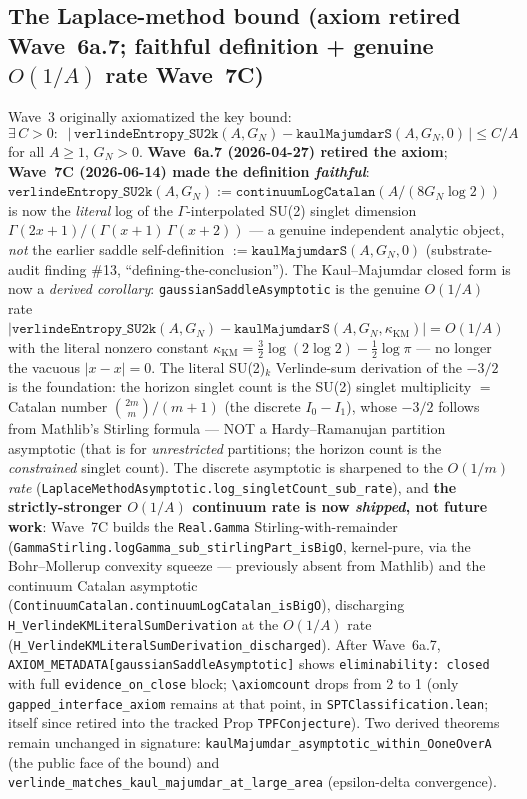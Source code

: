 \documentclass[aps,prd,twocolumn,showpacs,superscriptaddress,nofootinbib]{revtex4-2}
\begin{document}
\subsection{The Laplace-method bound (axiom retired Wave~6a.7; faithful definition + genuine $O(1/A)$ rate Wave~7C)}
\label{sec:saddle}

Wave~3 originally axiomatized the key bound:
\begin{equation}
\exists\,C > 0:\;\;
\bigl|\,\texttt{verlindeEntropy\_SU2k}(A, G_N) - \texttt{kaulMajumdarS}(A, G_N, 0)\,\bigr|
\leq C/A
\end{equation}
for all $A \geq 1$, $G_N > 0$.
\textbf{Wave~6a.7 (2026-04-27) retired the axiom}; \textbf{Wave~7C
(2026-06-14) made the definition \emph{faithful}}:
$\texttt{verlindeEntropy\_SU2k}(A, G_N) := \texttt{continuumLogCatalan}(A/(8 G_N \log 2))$
is now the \emph{literal} log of the $\Gamma$-interpolated SU(2) singlet dimension
$\Gamma(2x{+}1)/(\Gamma(x{+}1)\,\Gamma(x{+}2))$ --- a genuine independent analytic object,
\emph{not} the earlier saddle self-definition $:= \texttt{kaulMajumdarS}(A, G_N, 0)$
(substrate-audit finding \#13, ``defining-the-conclusion''). The Kaul--Majumdar closed form is
now a \emph{derived corollary}: \texttt{gaussianSaddleAsymptotic} is the genuine $O(1/A)$ rate
$|\texttt{verlindeEntropy\_SU2k}(A,G_N) - \texttt{kaulMajumdarS}(A,G_N,\kappa_{\mathrm{KM}})| =
O(1/A)$ with the literal nonzero constant $\kappa_{\mathrm{KM}} = \tfrac{3}{2}\log(2\log 2) -
\tfrac{1}{2}\log\pi$ --- no longer the vacuous $|x-x| = 0$. The literal SU(2)$_k$ Verlinde-sum
derivation of the $-3/2$ is the foundation: the horizon singlet count is the SU(2) singlet
multiplicity $=$ Catalan number $\binom{2m}{m}/(m{+}1)$ (the discrete $I_0-I_1$), whose $-3/2$
follows from Mathlib's Stirling formula --- NOT a Hardy--Ramanujan partition asymptotic (that is
for \emph{unrestricted} partitions; the horizon count is the \emph{constrained} singlet count).
The discrete asymptotic is sharpened to the $O(1/m)$ \emph{rate}
(\texttt{LaplaceMethodAsymptotic.log\_singletCount\_sub\_rate}), and \textbf{the strictly-stronger
$O(1/A)$ continuum rate is now \emph{shipped}, not future work}: Wave~7C builds the
\texttt{Real.Gamma} Stirling-with-remainder
(\texttt{GammaStirling.logGamma\_sub\_stirlingPart\_isBigO}, kernel-pure, via the Bohr--Mollerup
convexity squeeze --- previously absent from Mathlib) and the continuum Catalan asymptotic
(\texttt{ContinuumCatalan.continuumLogCatalan\_isBigO}), discharging
\texttt{H\_VerlindeKMLiteralSumDerivation} at the $O(1/A)$ rate
(\texttt{H\_VerlindeKMLiteralSumDerivation\_discharged}).
After Wave~6a.7, \texttt{AXIOM\_METADATA[\textquotesingle gaussianSaddleAsymptotic\textquotesingle]}
shows \texttt{eliminability: closed} with full \texttt{evidence\_on\_close} block;
\texttt{\textbackslash axiomcount} drops from 2 to 1 (only
\texttt{gapped\_interface\_axiom} remains at that point, in
\texttt{SPTClassification.lean}; itself since retired into the
tracked Prop \texttt{TPFConjecture}). Two derived theorems remain unchanged
in signature:
\texttt{kaulMajumdar\_asymptotic\_within\_OoneOverA} (the public face
of the bound) and
\texttt{verlinde\_matches\_kaul\_majumdar\_at\_large\_area}
(epsilon-delta convergence).
\end{document}
